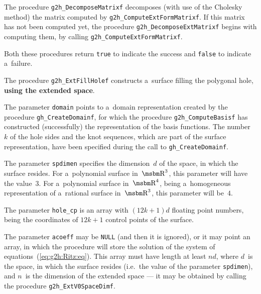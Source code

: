 \vspace{\medskipamount}
\begin{sloppypar}
The procedure \texttt{g2h\_DecomposeMatrixf} decomposes (with use of the Cholesky
method) the matrix computed by \texttt{g2h\_ComputeExtFormMatrixf}. If this
matrix has not been computed yet, the procedure \texttt{g2h\_DecomposeExtMatrixf}
begins with computing them, by calling \texttt{g2h\_ComputeExtFormMatrixf}.%
\end{sloppypar}

\vspace{\medskipamount}
Both these procedures return \texttt{true} to indicate the success and
\texttt{false} to indicate a~failure.


\vspace{\bigskipamount}
\begin{sloppypar}
The procedure \texttt{g2h\_ExtFillHolef} constructs a~surface filling the
polygonal hole, \textbf{using the extended space}.%
\end{sloppypar}

\begin{sloppypar}
The parameter \texttt{domain} points to a~domain representation created
by the procedure \texttt{gh\_CreateDomainf}, for which the procedure
\texttt{g2h\_ComputeBasisf} has constructed (successfully) the representation
of the basis functions. The number~$k$ of the hole sides and the knot sequences,
which are part of the surface representation, have been specified during
the call to \texttt{gh\_CreateDomainf}.%
\end{sloppypar}

The parameter \texttt{spdimen} specifies the dimension~$d$ of the space,
in which the surface resides. For a~polynomial surface in~$\R^3$, this
parameter will have the value~$3$. For a~polynomial surface in~$\R^4$,
being a~homogeneous representation of a~rational surface in~$\R^3$,
this parameter will be~$4$.

The parameter \texttt{hole\_cp} is an array with $(12k+1)d$ floating point
numbers, being the coordinates of $12k+1$ control points of the surface.

The parameter \texttt{acoeff} may be \texttt{NULL} (and then it is ignored),
or it may point an array, in which the procedure will store the solution  
of the system of equations~(\ref{eq:g2h:Ritz:eq}). This array must have   
length at least $nd$, where $d$~is the space, in which the surface resides
(i.e.\ the value of the parameter \texttt{spdimen}), and $n$~is
the dimension of the extended space --- it may be obtained by calling the
procedure \texttt{g2h\_ExtV0SpaceDimf}.

